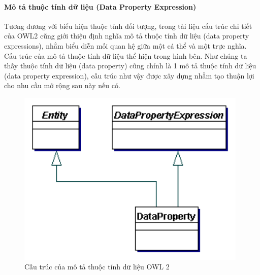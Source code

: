\paragraph{Mô tả thuộc tính dữ liệu (Data Property Expression)}
Tương đương với biểu hiện thuộc tính đối tượng, trong tài liệu cấu trúc chi tiết của OWL2 cũng giới thiệu định nghĩa mô tả thuộc tính dữ liệu (data property expressions), nhằm biểu diễn mối quan hệ giữa một cá thể và một trực nghĩa. Cấu trúc của mô tả thuộc tính dữ liệu thể hiện trong hình bên. Như chúng ta thấy thuộc tính dữ liệu (data property) cũng chính là 1 mô tả thuộc tính dữ liệu (data property expression), cấu trúc như vậy được xây dựng nhằm tạo thuận lợi cho nhu cầu mở rộng sau này nếu có.
\begin{figure}[h!]
	\centering
	\includegraphics[width=110mm]{Figures/data_property_expression.png}
	\caption{Cấu trúc của mô tả thuộc tính dữ liệu OWL 2\label{overflow}}
\end{figure}

